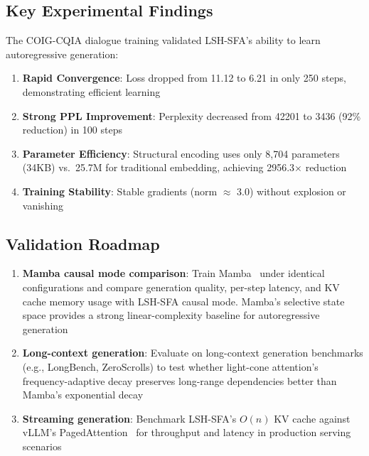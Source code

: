 \documentclass{article}
\begin{document}
\subsection{Key Experimental Findings}

The COIG-CQIA dialogue training validated LSH-SFA's ability to learn autoregressive generation:

\begin{enumerate}
\item \textbf{Rapid Convergence}: Loss dropped from 11.12 to 6.21 in only 250 steps, demonstrating efficient learning
\item \textbf{Strong PPL Improvement}: Perplexity decreased from 42201 to 3436 (92\% reduction) in 100 steps
\item \textbf{Parameter Efficiency}: Structural encoding uses only 8,704 parameters (34KB) vs.\ 25.7M for traditional embedding, achieving 2956.3$\times$ reduction
\item \textbf{Training Stability}: Stable gradients (norm $\approx$ 3.0) without explosion or vanishing
\end{enumerate}

\subsection{Validation Roadmap}

\begin{enumerate}
\item \textbf{Mamba causal mode comparison}: Train Mamba~\citep{gu2023mamba} under identical configurations and compare generation quality, per-step latency, and KV cache memory usage with LSH-SFA causal mode. Mamba's selective state space provides a strong linear-complexity baseline for autoregressive generation
\item \textbf{Long-context generation}: Evaluate on long-context generation benchmarks (e.g., LongBench, ZeroScrolls) to test whether light-cone attention's frequency-adaptive decay preserves long-range dependencies better than Mamba's exponential decay
\item \textbf{Streaming generation}: Benchmark LSH-SFA's $O(n)$ KV cache against vLLM's PagedAttention~\citep{kwon2023efficient} for throughput and latency in production serving scenarios
\end{enumerate}
\end{document}
